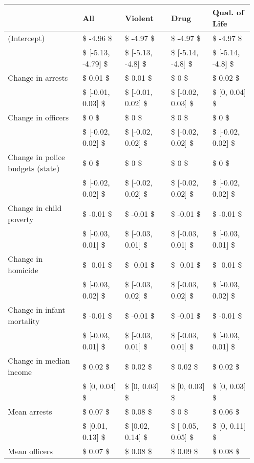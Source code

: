 \begin{table}[ht]
\centering
\begin{tabular}{lllll}
  \hline
  & All & Violent & Drug & Qual. of Life \\ 
  \hline
(Intercept) & \$ -4.96 \$ & \$ -4.97 \$ & \$ -4.97 \$ & \$ -4.97 \$ \\ 
   & \$ [-5.13, -4.79] \$ & \$ [-5.13, -4.8] \$ & \$ [-5.14, -4.8] \$ & \$ [-5.14, -4.8] \$ \\ 
  Change in arrests & \$ 0.01 \$ & \$ 0.01 \$ & \$ 0 \$ & \$ 0.02 \$ \\ 
   & \$ [-0.01, 0.03] \$ & \$ [-0.01, 0.02] \$ & \$ [-0.02, 0.03] \$ & \$ [0, 0.04] \$ \\ 
  Change in officers & \$ 0 \$ & \$ 0 \$ & \$ 0 \$ & \$ 0 \$ \\ 
   & \$ [-0.02, 0.02] \$ & \$ [-0.02, 0.02] \$ & \$ [-0.02, 0.02] \$ & \$ [-0.02, 0.02] \$ \\ 
  Change in police budgets (state) & \$ 0 \$ & \$ 0 \$ & \$ 0 \$ & \$ 0 \$ \\ 
   & \$ [-0.02, 0.02] \$ & \$ [-0.02, 0.02] \$ & \$ [-0.02, 0.02] \$ & \$ [-0.02, 0.02] \$ \\ 
  Change in child poverty & \$ -0.01 \$ & \$ -0.01 \$ & \$ -0.01 \$ & \$ -0.01 \$ \\ 
   & \$ [-0.03, 0.01] \$ & \$ [-0.03, 0.01] \$ & \$ [-0.03, 0.01] \$ & \$ [-0.03, 0.01] \$ \\ 
  Change in homicide & \$ -0.01 \$ & \$ -0.01 \$ & \$ -0.01 \$ & \$ -0.01 \$ \\ 
   & \$ [-0.03, 0.02] \$ & \$ [-0.03, 0.02] \$ & \$ [-0.03, 0.02] \$ & \$ [-0.03, 0.02] \$ \\ 
  Change in infant mortality & \$ -0.01 \$ & \$ -0.01 \$ & \$ -0.01 \$ & \$ -0.01 \$ \\ 
   & \$ [-0.03, 0.01] \$ & \$ [-0.03, 0.01] \$ & \$ [-0.03, 0.01] \$ & \$ [-0.03, 0.01] \$ \\ 
  Change in median income & \$ 0.02 \$ & \$ 0.02 \$ & \$ 0.02 \$ & \$ 0.02 \$ \\ 
   & \$ [0, 0.04] \$ & \$ [0, 0.03] \$ & \$ [0, 0.03] \$ & \$ [0, 0.03] \$ \\ 
  Mean arrests & \$ 0.07 \$ & \$ 0.08 \$ & \$ 0 \$ & \$ 0.06 \$ \\ 
   & \$ [0.01, 0.13] \$ & \$ [0.02, 0.14] \$ & \$ [-0.05, 0.05] \$ & \$ [0, 0.11] \$ \\ 
  Mean officers & \$ 0.07 \$ & \$ 0.08 \$ & \$ 0.09 \$ & \$ 0.08 \$ \\ 

\end{tabular}
\end{table}
